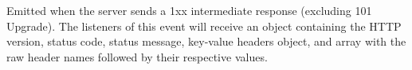 Emitted when the server sends a 1xx intermediate response (excluding 101
Upgrade). The listeners of this event will receive an object containing
the HTTP version, status code, status message, key-value headers object,
and array with the raw header names followed by their respective values.

\begin{Shaded}
\begin{Highlighting}[]
 \OperatorTok{;}

\OperatorTok{=}\NormalTok{ \{}
  \OperatorTok{:} \OperatorTok{,}
  \OperatorTok{:} \OperatorTok{,}
  \OperatorTok{:} \OperatorTok{,}
\NormalTok{\}}\OperatorTok{;}

\OperatorTok{=} \OperatorTok{;}
\NormalTok{()}\OperatorTok{;}

\NormalTok{(}\OperatorTok{,}\KeywordTok{=\textgreater{}}\NormalTok{ \{}
  \NormalTok{(}\SpecialCharTok{$\{}\SpecialCharTok{\}}\VerbatimStringTok{\textasciigrave{}}\NormalTok{)}\OperatorTok{;}
\NormalTok{\})}\OperatorTok{;}
\end{Highlighting}
\end{Shaded}

